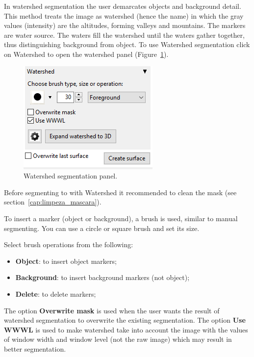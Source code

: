 In watershed segmentation the user demarcates objects and background detail. This method treats the image as watershed (hence the name) in which the gray values (intensity) are the altitudes, forming valleys and mountains. The markers are water source. The waters fill the watershed until the waters gather together, thus distinguishing background from object. To use Watershed segmentation click on Watershed to open the watershed panel (Figure~\ref{fig:watershed_painel}).

\begin{figure}[!htb]
\centering
\includegraphics[scale=0.75]{../user_guide_figures/invesalius_screen/segmentation_watershed_panel_en.png}
\caption{Watershed segmentation panel.}
\label{fig:watershed_painel}
\end{figure}

Before segmenting to with Watershed it recommended to clean the mask (see section~\ref{cap:limpeza_mascara}).

To insert a marker (object or background), a brush is used, similar to manual segmenting. You can use a circle or square brush and set its size.

Select brush operations from the following:

\begin{itemize}
    \item \textbf{Object}: to insert object markers;
    \item \textbf{Background}: to insert background markers (not object);
    \item \textbf{Delete}: to delete markers;
\end{itemize}


The option \textbf{Overwrite mask} is used when the user wants the result of watershed segmentation to overwrite the existing segmentation. The option \textbf{Use WWWL} is used to make watershed take into account the image with the values of window width and window level (not the raw image) which may result in better segmentation.

